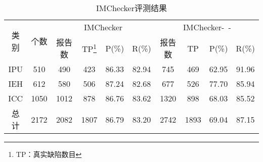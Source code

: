 \begin{table}[b]
	\centering
	\begin{minipage}[t]{0.95\linewidth} %
		\caption{IMChecker评测结果}
		\label{tab:3-4-imchecker}
		\begin{tabular}{@{\extracolsep{4pt}}cccccccccc@{}}
			\hline
			\multirow{2}{*}{类别 } & \multirow{2}{*}{个数} & \multicolumn{4}{c}{IMChecker} & \multicolumn{4}{c}{IMChecker-~-} \\
			\cline{3-6} \cline{7-10}
			 & & 报告数 & TP\footnote{TP：真实缺陷数目} & P(\%) & R(\%) & 报告数 & TP& P(\%) & R(\%) \\
			 \hline
			 IPU & 510 & 490 & 423 & 86.33 & 82.94 & 745 & 469 & 62.95 & 91.96 \\
			 IEH & 612 & 580 & 506 & 87.24 & 82.68 & 677 & 526 & 77.70 & 85.94 \\
			 ICC & 1050 & 1012 & 878 & 86.76 & 83.62 & 1320 & 898 & 68.03 & 85.52 \\
			 总计 & 2172 &  2082 & 1807 & 86.79 & 83.20 & 2742 & 1893 & 69.04 & 87.15 \\
			\hline
		\end{tabular}
	\end{minipage}
\end{table}